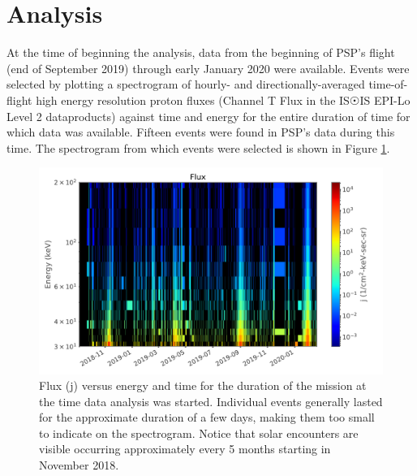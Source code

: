 \documentclass[letterpaper,11pt]{article}
\begin{document}


\section{Analysis}
\label{sec:analysis}
At the time of beginning the analysis, data from the beginning of PSP's flight (end of September 2019) through early January 2020 were available.  Events were selected by plotting a spectrogram of hourly- and directionally-averaged time-of-flight high energy resolution proton fluxes (Channel T Flux in the IS$\Sun$IS EPI-Lo Level 2 dataproducts) against time and energy for the entire duration of time for which data was available.  Fifteen events were found in PSP's data during this time.  The spectrogram from which events were selected is shown in Figure \ref{fig:flux_global}.

\begin{figure}[htbp]
\centering
\includegraphics[width=1.\linewidth]{figures/flux_global(notshown).pdf}
\caption{Flux (j) versus energy and time for the duration of the mission at the time data analysis was started.  Individual events generally lasted for the approximate duration of a few days, making them too small to indicate on the spectrogram.  Notice that solar encounters are visible occurring approximately every 5 months starting in November 2018.}
\label{fig:flux_global}
\end{figure}
\end{document}
